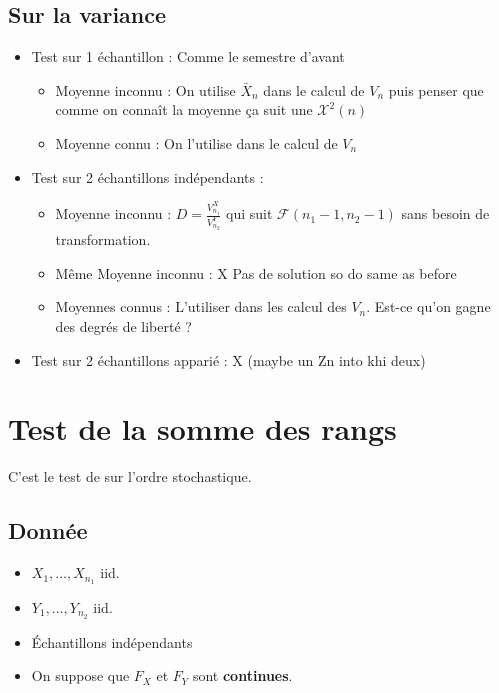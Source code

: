 \documentclass{article}
\theoremstyle{plain}%
\theoremstyle{definition}
\theoremstyle{remark}
\begin{document}
\subsection{Sur la variance}
\begin{itemize}
    \item Test sur 1 échantillon : Comme le semestre d'avant \begin{itemize}
        \item Moyenne inconnu : On utilise $ \bar{X}_n $ dans le calcul de $ V_n $ puis penser que comme on connaît la moyenne ça suit une $ \mathcal{X}^2(n) $ 
        \item Moyenne connu : On l'utilise dans le calcul de $ V_n $ 
    \end{itemize}
    
    \item Test sur 2 échantillons indépendants : \begin{itemize}
        \item Moyenne inconnu : $ D = \frac{V_{n_1}^X}{V_{n_2}^Y} $ qui suit $ \mathcal{F}(n_1 - 1, n_2 - 1) $ sans besoin de transformation.
        \item Même Moyenne inconnu : X Pas de solution so do same as before
        \item Moyennes connus : L'utiliser dans les calcul des $ V_n $. Est-ce qu'on gagne des degrés de liberté ?
    \end{itemize}

    \item Test sur 2 échantillons apparié : X (maybe un Zn into khi deux)
\end{itemize}

\section{Test de la somme des rangs}
C'est le test de sur l'ordre stochastique.

\subsection*{Donnée}
\begin{itemize}
    \item $ X_1, \dots, X_{n_1}  $ iid. 
    \item $ Y_1, \dots, Y_{n_2}  $ iid.
    \item Échantillons indépendants
    \item On suppose que $ F_X $ et $ F_Y $ sont \textbf{continues}.
\end{itemize}
\end{document}
